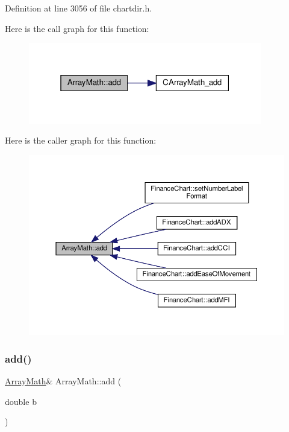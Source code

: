 Definition at line 3056 of file chartdir.\+h.

Here is the call graph for this function\+:
\nopagebreak
\begin{figure}[H]
\begin{center}
\leavevmode
\includegraphics[width=289pt]{class_array_math_a0523eb1e6ea490c1a298a8b9bca05833_cgraph}
\end{center}
\end{figure}
Here is the caller graph for this function\+:
\nopagebreak
\begin{figure}[H]
\begin{center}
\leavevmode
\includegraphics[width=350pt]{class_array_math_a0523eb1e6ea490c1a298a8b9bca05833_icgraph}
\end{center}
\end{figure}
\mbox{\label{class_array_math_a3ebc72308c94fd2ea7dbf1407e8c9eeb}} 
\subsubsection{\texorpdfstring{add()}{add()}\hspace{0.1cm}{\footnotesize\ttfamily [2/2]}}
{\footnotesize\ttfamily \hyperlink{class_array_math}{Array\+Math}\& Array\+Math\+::add (\begin{DoxyParamCaption}\item[{double}]{b }\end{DoxyParamCaption})\hspace{0.3cm}{\ttfamily [inline]}}



